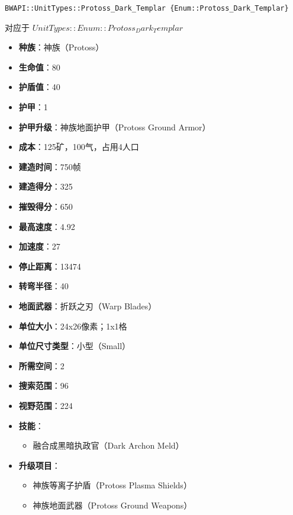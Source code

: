\begin{tcolorbox}[colback=white, colframe=black!60!white, title=Protoss\_Dark\_Templar(), arc=0mm]
    \begin{verbatim}
BWAPI::UnitTypes::Protoss_Dark_Templar {Enum::Protoss_Dark_Templar}
    \end{verbatim}
    对应于  $ UnitTypes::Enum::Protoss_Dark_Templar $ 
    \begin{itemize}
        \item \textbf{种族}：神族（Protoss）
        \item \textbf{生命值}：80
        \item \textbf{护盾值}：40
        \item \textbf{护甲}：1
        \item \textbf{护甲升级}：神族地面护甲（Protoss Ground Armor）
        \item \textbf{成本}：125矿，100气，占用4人口
        \item \textbf{建造时间}：750帧
        \item \textbf{建造得分}：325
        \item \textbf{摧毁得分}：650
        \item \textbf{最高速度}：4.92
        \item \textbf{加速度}：27
        \item \textbf{停止距离}：13474
        \item \textbf{转弯半径}：40
        \item \textbf{地面武器}：折跃之刃（Warp Blades）
        \item \textbf{单位大小}：24x26像素；1x1格
        \item \textbf{单位尺寸类型}：小型（Small）
        \item \textbf{所需空间}：2
        \item \textbf{搜索范围}：96
        \item \textbf{视野范围}：224
        \item \textbf{技能}：
            \begin{itemize}
                \item 融合成黑暗执政官（Dark Archon Meld）
            \end{itemize}
        \item \textbf{升级项目}：
            \begin{itemize}
                \item 神族等离子护盾（Protoss Plasma Shields）
                \item 神族地面武器（Protoss Ground Weapons）

\end{itemize}
\end{itemize}
\end{tcolorbox}
